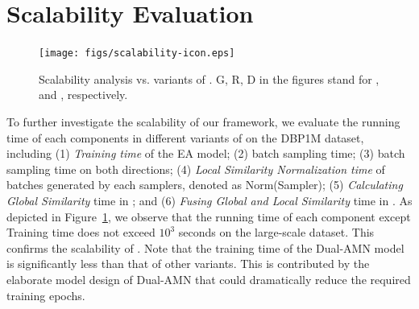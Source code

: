 \section{Scalability Evaluation}
\label{app:scalability}

\begin{figure}[t]
\centering
\texttt{[image: figs/scalability-icon.eps]}\vspace*{-4.5mm}\\
\caption{Scalability analysis vs. variants of \ClusterEA{}. G, R, D in the figures stand for ,  and , respectively.}
\label{fig:scalability}
\end{figure}
To further investigate the scalability of our \ClusterEA{} framework, we evaluate the running time of each components in different variants of \ClusterEA{} on the DBP1M dataset, including (1) \emph{Training time} of the EA model; (2) \emph{\KMeans{}} batch sampling time; (3) \emph{\MetisGCN{}} batch sampling time on both directions; (4) \emph{Local Similarity Normalization time} of batches generated by each samplers, denoted as Norm(Sampler); (5) \emph{Calculating Global Similarity} time in \Merging{}; and (6) \emph{Fusing Global and Local Similarity} time in \Merging{}. 
As depicted in Figure~\ref{fig:scalability}, we observe that the running time of each component except Training time does not exceed $10^3$ seconds on the large-scale dataset.
This confirms the scalability of \ClusterEA{}. Note that the training time of the Dual-AMN model is significantly less than that of other variants. This is contributed by the elaborate model design of Dual-AMN that could dramatically reduce the required training epochs.
